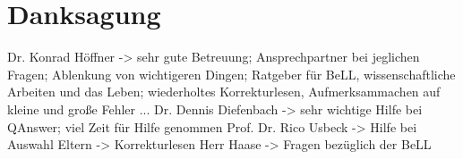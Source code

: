 


\bigskip

\begingroup
\let\clearpage\relax
\let\cleardoublepage\relax
\let\cleardoublepage\relax
\chapter*{Danksagung}

Dr. Konrad Höffner -> sehr gute Betreuung; Ansprechpartner bei jeglichen Fragen; Ablenkung von wichtigeren Dingen; Ratgeber für BeLL, wissenschaftliche Arbeiten und das Leben; wiederholtes Korrekturlesen, Aufmerksammachen auf kleine und große Fehler ...
Dr. Dennis Diefenbach -> sehr wichtige Hilfe bei QAnswer; viel Zeit für Hilfe genommen
Prof. Dr. Rico Usbeck -> Hilfe bei Auswahl
Eltern -> Korrekturlesen
Herr Haase -> Fragen bezüglich der BeLL

\endgroup
